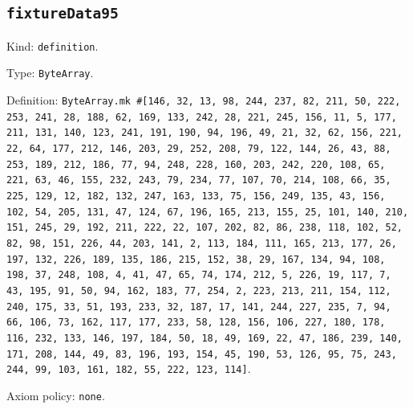 \documentclass[11pt]{article}
\begin{document}
\subsection*{\texttt{fixtureData95}}
\noindent Kind: \texttt{definition}.\par
\noindent Type: \texttt{ByteArray}.\par
\noindent Definition: \texttt{ByteArray.mk \#[146, 32, 13, 98, 244, 237, 82, 211, 50, 222, 253, 241, 28, 188, 62, 169, 133, 242, 28, 221, 245, 156, 11, 5, 177, 211, 131, 140, 123, 241, 191, 190, 94, 196, 49, 21, 32, 62, 156, 221, 22, 64, 177, 212, 146, 203, 29, 252, 208, 79, 122, 144, 26, 43, 88, 253, 189, 212, 186, 77, 94, 248, 228, 160, 203, 242, 220, 108, 65, 221, 63, 46, 155, 232, 243, 79, 234, 77, 107, 70, 214, 108, 66, 35, 225, 129, 12, 182, 132, 247, 163, 133, 75, 156, 249, 135, 43, 156, 102, 54, 205, 131, 47, 124, 67, 196, 165, 213, 155, 25, 101, 140, 210, 151, 245, 29, 192, 211, 222, 22, 107, 202, 82, 86, 238, 118, 102, 52, 82, 98, 151, 226, 44, 203, 141, 2, 113, 184, 111, 165, 213, 177, 26, 197, 132, 226, 189, 135, 186, 215, 152, 38, 29, 167, 134, 94, 108, 198, 37, 248, 108, 4, 41, 47, 65, 74, 174, 212, 5, 226, 19, 117, 7, 43, 195, 91, 50, 94, 162, 183, 77, 254, 2, 223, 213, 211, 154, 112, 240, 175, 33, 51, 193, 233, 32, 187, 17, 141, 244, 227, 235, 7, 94, 66, 106, 73, 162, 117, 177, 233, 58, 128, 156, 106, 227, 180, 178, 116, 232, 133, 146, 197, 184, 50, 18, 49, 169, 22, 47, 186, 239, 140, 171, 208, 144, 49, 83, 196, 193, 154, 45, 190, 53, 126, 95, 75, 243, 244, 99, 103, 161, 182, 55, 222, 123, 114]}.\par
\noindent Axiom policy: \texttt{none}.\par
\end{document}
